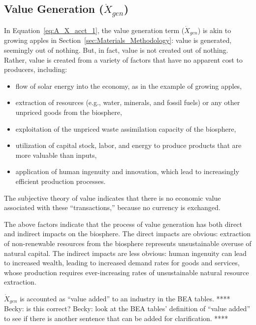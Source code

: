 \subsection{Value Generation ($\dot{X}_{gen}$)}

\noindent In Equation~\ref{eq:A_X_acct_1}, 
the value generation term ($\dot{X}_{gen}$) is akin to growing apples
in Section~\ref{sec:Materials_Methodology}: 
value is generated, seemingly out of nothing.
But, in fact, value is not created out of nothing. 
Rather, value is created from a variety of factors that have no apparent cost
to producers, including:

\begin{itemize}
	\item{flow of solar energy
	into the economy,
	as in the example of growing apples,}
	\item{extraction of resources (e.g., water, minerals, and
	fossil fuels) or any other unpriced goods from the biosphere,}
	\item{exploitation of the unpriced waste assimilation capacity of the biosphere,}
	\item{utilization of capital stock, labor, and energy to produce products
	that are more valuable than inputs,}
	\item{application of human ingenuity 
	and innovation, 
	which lead to increasingly efficient production processes.}
\end{itemize}

\noindent{}The subjective theory of value indicates that 
there is no economic value associated with these ``transactions,''
because no currency is exchanged. 

The above factors indicate that the process of value generation
has both direct and indirect impacts on the biosphere.
The direct impacts are obvious: 
extraction of non-renewable resources from the biosphere 
represents unsustainable overuse of natural capital.
The indirect impacts are less obvious: 
human ingenuity can lead to increased wealth,
leading to increased demand rates for goods and services, 
whose production requires ever-increasing rates 
of unsustainable natural resource extraction.

$\dot{X}_{gen}$ is accounted as ``value added'' to an industry in the BEA tables.
**** Becky: is this correct? 
Becky: look at the BEA tables' definition of ``value added'' to 
see if there is another sentence that can be added for clarification. ****


